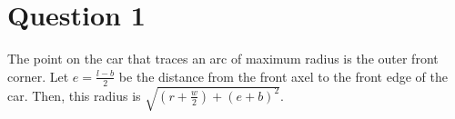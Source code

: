\section{Question 1}

The point on the car that traces an arc of maximum radius is the outer front corner.  Let $e = \frac{l - b}{2}$ be the distance from the front axel to the front edge of the car. Then, this radius is $\sqrt{(r + \frac{w}{2}) + (e + b)^2}$.